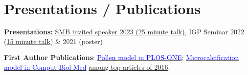 \documentclass[letter,12pt]{article}
\makeatletter
\newcommand{\resumeItem}[2]{
  \item\small{
    \textbf{#1}{: #2 \vspace{-4pt}}
  }
}
\newcommand{\resumeSubheading}[2]{
  \vspace{-2pt}\item
    \begin{tabular*}{0.97\textwidth}{l@{\extracolsep{\fill}}r}
      \textbf{#1} & #2 \\
    \end{tabular*}\vspace{-6pt}
}
\newcommand{\resumeSubHeadingListStart}{\begin{itemize}[leftmargin=*]}
\newcommand{\resumeItemListStart}{\begin{itemize}}
\newcommand{\resumeItemListEnd}{\end{itemize}\vspace{-5pt}}
\makeatother
\begin{document}
\vspace{-10pt}
\section{\textbf{Presentations / Publications}}
\begin{description}[font=$\bullet$]

\item {\textbf{Presentations:} \underline{SMB invited speaker 2023 (25 minute talk)}, IGP Seminar 2022 (\underline{15 minute talk}) \& 2021 (poster)}
\vspace{-5pt}
\item{\textbf{First Author Publications}: \href{https://doi.org/10.1371/journal.pcbi.1006800}{\textcolor{blue}{Pollen model in PLOS-ONE}}; \href{https://doi.org/10.1016/j.compbiomed.2016.06.020}{\textcolor{blue}{Microcalcification model in Comput Biol Med}} \underline{among top articles of 2016}. }

\end{description}
%
\end{document}
